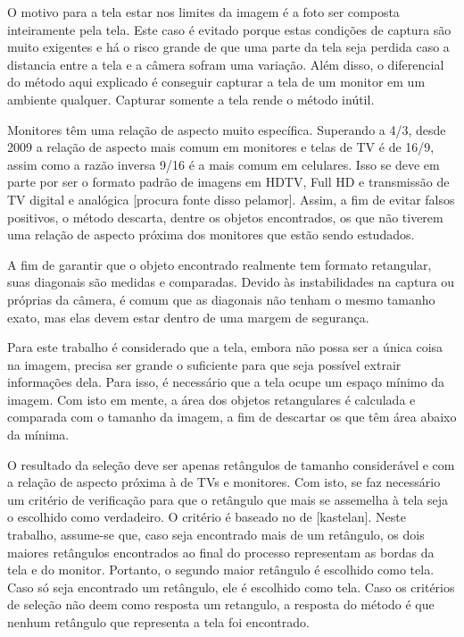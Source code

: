 O motivo para a tela estar nos limites da imagem é a foto ser composta inteiramente pela tela. Este caso é evitado porque estas condições de captura são muito exigentes e há o risco grande de que uma parte da tela seja perdida caso a distancia entre a tela e a câmera sofram uma variação. Além disso, o diferencial do método aqui explicado é conseguir capturar a tela de um monitor em um ambiente qualquer. Capturar somente a tela rende o método inútil.

Monitores têm uma relação de aspecto muito específica. Superando a 4/3, desde 2009 a relação de aspecto mais comum em monitores e telas de TV é de 16/9, assim como a razão inversa 9/16 é a mais comum em celulares. Isso se deve em parte por ser o formato padrão de imagens em HDTV, Full HD e transmissão de TV digital e analógica [procura fonte disso pelamor]. Assim, a fim de evitar falsos positivos, o método descarta, dentre os objetos encontrados, os que não tiverem uma relação de aspecto próxima dos monitores que estão sendo estudados.

A fim de garantir que o objeto encontrado realmente tem formato retangular, suas diagonais são medidas e comparadas. Devido às instabilidades na captura ou próprias da câmera, é comum que as diagonais não tenham o mesmo tamanho exato, mas elas devem estar dentro de uma margem de segurança.

Para este trabalho é considerado que a tela, embora não possa ser a única coisa na imagem, precisa ser grande o suficiente para que seja possível extrair informações dela. Para isso, é necessário que a tela ocupe um espaço mínimo da imagem. Com isto em mente, a área dos objetos retangulares é calculada e comparada com o tamanho da imagem, a fim de descartar os que têm área abaixo da mínima.

O resultado da seleção deve ser apenas retângulos de tamanho considerável e com a relação de aspecto próxima à de TVs e monitores. Com isto, se faz necessário um critério de verificação para que o retângulo que mais se assemelha à tela seja o escolhido como verdadeiro. O critério é baseado no de [kastelan]. Neste trabalho, assume-se que, caso seja encontrado mais de um retângulo, os dois maiores retângulos encontrados ao final do processo representam as bordas da tela e do monitor. Portanto, o segundo maior retângulo é escolhido como tela. Caso só seja encontrado um retângulo, ele é escolhido como tela. Caso os critérios de seleção não deem como resposta um retangulo, a resposta do método é que nenhum retângulo que representa a tela foi encontrado.

